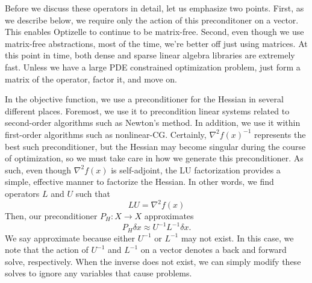 \documentclass{report}
\begin{document}
        Before we discuss these operators in detail, let us emphasize two points.  First, as we describe below, we require only the action of this preconditoner on a vector.  This enables Optizelle to continue to be matrix-free.  Second, even though we use matrix-free abstractions, most of the time, we're better off just using matrices.  At this point in time, both dense and sparse linear algebra libraries are extremely fast.  Unless we have a large PDE constrained optimization problem, just form a matrix of the operator, factor it, and move on.
        
        In the objective function, we use a preconditioner for the Hessian in several different places.  Foremost, we use it to precondition linear systems related to second-order algorithms such as Newton's method.  In addition, we use it within first-order algorithms such as nonlinear-CG.  Certainly, $\nabla^2 f(x)^{-1}$ represents the best such preconditioner, but the Hessian may become singular during the course of optimization, so we must take care in how we generate this preconditioner.  As such, even though $\nabla^2 f(x)$ is self-adjoint, the LU factorization provides a simple, effective manner to factorize the Hessian.  In other words, we find operators $L$ and $U$ such that
$$
        LU=\nabla^2 f(x)
$$
Then, our preconditioner $P_H:X\rightarrow X$ approximates 
$$
        P_H\delta x \approx U^{-1}L^{-1} \delta x.
$$
We say approximate because either $U^{-1}$ or $L^{-1}$ may not exist.  In this case, we note that the action of $U^{-1}$ and $L^{-1}$ on a vector denotes a back and forward solve, respectively.  When the inverse does not exist, we can simply modify these solves to ignore any variables that cause problems.
\end{document}

